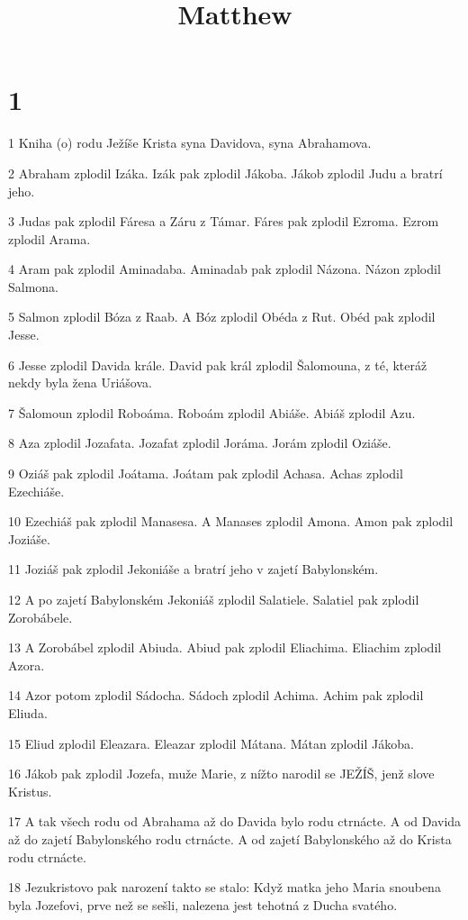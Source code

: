 

\title{Matthew}

\chapter{1}

\par 1 Kniha (o) rodu Ježíše Krista syna Davidova, syna Abrahamova.
\par 2 Abraham zplodil Izáka. Izák pak zplodil Jákoba. Jákob zplodil Judu a bratrí jeho.
\par 3 Judas pak zplodil Fáresa a Záru z Támar. Fáres pak zplodil Ezroma. Ezrom zplodil Arama.
\par 4 Aram pak zplodil Aminadaba. Aminadab pak zplodil Názona. Názon zplodil Salmona.
\par 5 Salmon zplodil Bóza z Raab. A Bóz zplodil Obéda z Rut. Obéd pak zplodil Jesse.
\par 6 Jesse zplodil Davida krále. David pak král zplodil Šalomouna, z té, kteráž nekdy byla žena Uriášova.
\par 7 Šalomoun zplodil Roboáma. Roboám zplodil Abiáše. Abiáš zplodil Azu.
\par 8 Aza zplodil Jozafata. Jozafat zplodil Joráma. Jorám zplodil Oziáše.
\par 9 Oziáš pak zplodil Joátama. Joátam pak zplodil Achasa. Achas zplodil Ezechiáše.
\par 10 Ezechiáš pak zplodil Manasesa. A Manases zplodil Amona. Amon pak zplodil Joziáše.
\par 11 Joziáš pak zplodil Jekoniáše a bratrí jeho v zajetí Babylonském.
\par 12 A po zajetí Babylonském Jekoniáš zplodil Salatiele. Salatiel pak zplodil Zorobábele.
\par 13 A Zorobábel zplodil Abiuda. Abiud pak zplodil Eliachima. Eliachim zplodil Azora.
\par 14 Azor potom zplodil Sádocha. Sádoch zplodil Achima. Achim pak zplodil Eliuda.
\par 15 Eliud zplodil Eleazara. Eleazar zplodil Mátana. Mátan zplodil Jákoba.
\par 16 Jákob pak zplodil Jozefa, muže Marie, z nížto narodil se JEŽÍŠ, jenž slove Kristus.
\par 17 A tak všech rodu od Abrahama až do Davida bylo rodu ctrnácte. A od Davida až do zajetí Babylonského rodu ctrnácte. A od zajetí Babylonského až do Krista rodu ctrnácte.
\par 18 Jezukristovo pak narození takto se stalo: Když matka jeho Maria snoubena byla Jozefovi, prve než se sešli, nalezena jest tehotná z Ducha svatého.
